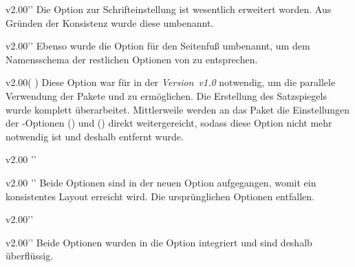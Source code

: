 \begin{Obsolete}{v2.00}{}''
\printdeclarationlist%
%
Die Option zur Schrifteinstellung ist wesentlich erweitert worden. Aus Gründen 
der Konsistenz wurde diese umbenannt.
\end{Obsolete}

\begin{Obsolete}{v2.00}{}''
\printdeclarationlist%
%
Ebenso wurde die Option für den Seitenfuß umbenannt, um dem Namensschema der 
restlichen Optionen von \TUDScript zu entsprechen.
\end{Obsolete}

\begin{Obsolete}{v2.00}{}(%
)
\printdeclarationlist%
%
Diese Option war für \TUDScript in der \emph{Version~v1.0} notwendig, um die 
parallele Verwendung der Pakete  und  zu 
ermöglichen. Die Erstellung des Satzspiegels wurde komplett überarbeitet. 
Mittlerweile werden an das Paket  die Einstellungen der 
\KOMAScript-Optionen () und 
() direkt weitergereicht, sodass diese 
Option nicht mehr notwendig ist und deshalb entfernt wurde.
\end{Obsolete}

\begin{Obsolete}{v2.00}{}%
  ''%
\begin{Obsolete}{v2.00}{}%
  ''%
\printdeclarationlist%
%
Beide Optionen sind in der neuen Option  
aufgegangen, womit ein konsistentes Layout erreicht wird. Die ursprünglichen 
Optionen entfallen. 
\end{Obsolete}
\end{Obsolete}

\begin{Obsolete}{v2.00}{}''
\begin{Obsolete}{v2.00}{}''
\printdeclarationlist%
%
Beide Optionen wurden in die Option  integriert und sind 
deshalb überflüssig.
\end{Obsolete}
\end{Obsolete}

